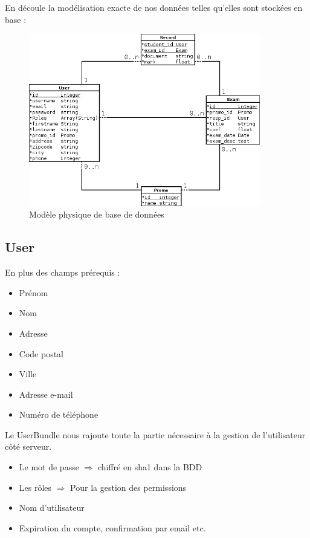\documentclass{report}
\begin{document}
    En découle la modélisation exacte de nos données telles qu'elles sont stockées en base :
    \begin{figure}[!h]
      \includegraphics[width=0.9\textwidth]{./db.png}
      \caption{Modèle physique de base de données}
    \end{figure}
    \clearpage

    \subsection{User}
      En plus des champs prérequis :
      \begin{itemize}
        \item{Prénom}
        \item{Nom}
        \item{Adresse}
        \item{Code postal}
        \item{Ville}
        \item{Adresse e-mail}
        \item{Numéro de téléphone}
      \end{itemize}\vspace{1em}

      Le UserBundle nous rajoute toute la partie nécessaire à la gestion de
      l'utilisateur côté serveur.
      \begin{itemize}
        \item{Le mot de passe $\Rightarrow$ chiffré en sha1 dans la BDD}
        \item{Les rôles $\Rightarrow$ Pour la gestion des permissions}
        \item{Nom d'utilisateur}
        \item{Expiration du compte, confirmation par email etc.}
      \end{itemize}\vspace{1em}
\end{document}
